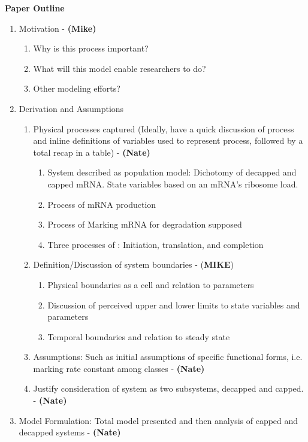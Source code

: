 \documentclass[review]{elsarticle}
\begin{document}
\textbf{Paper Outline}
\begin{enumerate}
\item Motivation - \textbf{(Mike)}
\begin{enumerate}
\item Why is this process important?
\item What will this model enable researchers to do?
\item Other modeling efforts?
\end{enumerate}
\item Derivation and Assumptions
\begin{enumerate}
\item Physical processes captured (Ideally, have a quick discussion of process and inline definitions of variables used to represent process, followed by a total recap in a table)  - \textbf{(Nate)}
\begin{enumerate}
\item System described as population model: Dichotomy of decapped and capped mRNA.
State variables based on an mRNA's ribosome load.
\item Process of mRNA production
\item Process of Marking mRNA for degradation supposed
\item Three processes of : Initiation, translation, and completion
\end{enumerate}
\item Definition/Discussion of system boundaries - (\textbf{MIKE})
\begin{enumerate}
\item Physical boundaries as a cell and relation to parameters
\item Discussion of perceived upper and lower limits to state variables and parameters
\item Temporal boundaries and relation to steady state
\end{enumerate}
\item Assumptions: Such as initial assumptions of specific functional forms, i.e. marking rate constant among classes  - \textbf{(Nate)}
\item Justify consideration of system as two subsystems, decapped and capped.  - \textbf{(Nate)}
\end{enumerate}
\item Model Formulation: Total model presented and then analysis of capped and decapped systems  - \textbf{(Nate)}

\end{enumerate}
\end{document}
